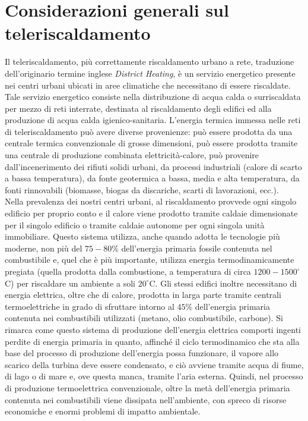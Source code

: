 \documentclass[laurea,oneside,11pt]{USiena_tesiLM3}
\begin{document}
\section{Considerazioni generali sul teleriscaldamento}
Il teleriscaldamento, più correttamente riscaldamento urbano a rete, traduzione dell'originario termine inglese \textit{District Heating}, è un servizio energetico presente nei centri urbani ubicati in aree climatiche che necessitano di essere riscaldate.
Tale servizio energetico consiste nella distribuzione di acqua calda o surriscaldata per mezzo di reti interrate, destinata al riscaldamento degli edifici ed alla produzione di acqua calda igienico-sanitaria.
L'energia termica immessa nelle reti di teleriscaldamento può avere diverse provenienze: può essere prodotta da una centrale termica convenzionale di grosse dimensioni, può essere prodotta tramite una centrale di produzione combinata elettricità-calore, può provenire dall'incenerimento dei rifiuti solidi urbani, da processi industriali (calore di scarto a bassa temperatura), da fonte geotermica a bassa, media e alta temperatura, da fonti rinnovabili (biomasse, biogas da discariche, scarti di lavorazioni, ecc.).\\

Nella prevalenza dei nostri centri urbani, al riscaldamento provvede ogni singolo edificio per proprio conto e il calore viene prodotto tramite caldaie dimensionate per il singolo edificio o tramite caldaie autonome per ogni singola unità immobiliare.
Questo sistema utilizza, anche quando adotta le tecnologie più moderne, non più del $75-80\%$ dell'energia primaria fossile contenuta nel combustibile e, quel che è più importante, utilizza energia termodinamicamente pregiata (quella prodotta dalla combustione, a temperatura di circa $1200-1500 ^{\circ}$C) per riscaldare un ambiente a soli $20 ^{\circ}$C.
Gli stessi edifici inoltre necessitano di energia elettrica, oltre che di calore, prodotta in larga parte tramite centrali termoelettriche in grado di sfruttare intorno al $45\%$ dell'energia primaria contenuta nei combustibili utilizzati (metano, olio combustibile, carbone).
Si rimarca come questo sistema di produzione dell'energia elettrica comporti ingenti perdite di energia primaria in quanto, affinché il ciclo termodinamico che sta alla base del processo di produzione dell'energia possa funzionare, il vapore allo scarico della turbina deve essere condensato, e ciò avviene tramite acqua di fiume, di lago o di mare e, ove questa manca, tramite l'aria esterna. Quindi, nel processo di produzione termoelettrica convenzionale, oltre la metà dell'energia primaria contenuta nei combustibili viene dissipata nell'ambiente, con spreco di risorse economiche e enormi problemi di impatto ambientale.\\
\end{document}
